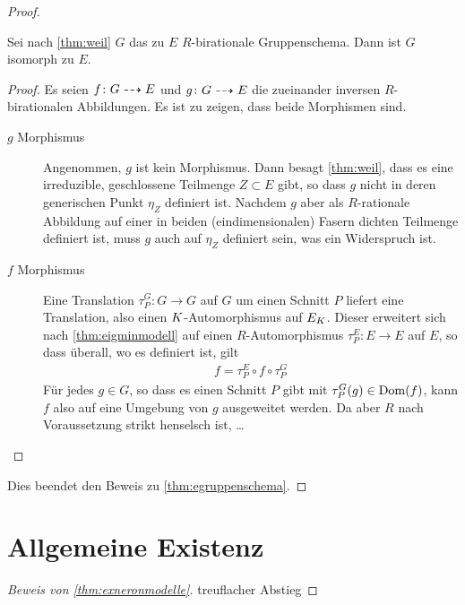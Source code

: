 \documentclass[german]{scrreprt}
\begin{document}
\begin{Satz}
\begin{proof}
    \begin{Lemma}
      Sei nach \ref{thm:weil} $G$ das zu $E$ $R$-birationale
      Gruppenschema. Dann ist $G$ isomorph zu $E$.
      \begin{proof}
        Es seien $f\colon G\dashrightarrow E$ und $g\colon G\dashrightarrow E$ die
        zueinander inversen $R$-birationalen Abbildungen.
        Es ist zu zeigen, dass beide Morphismen sind.
        \begin{description}
        \item[$g$ Morphismus] Angenommen, $g$ ist kein
          Morphismus. Dann besagt \ref{thm:weil}, dass es eine
          irreduzible, geschlossene Teilmenge $Z\subset E$ gibt, so
          dass $g$ nicht in deren generischen Punkt $\eta_Z$ definiert
          ist. Nachdem $g$ aber als $R$-rationale Abbildung auf einer
          in beiden (eindimensionalen) Fasern dichten Teilmenge
          definiert ist, muss $g$ auch auf $\eta_Z$ definiert sein,
          was ein Widerspruch ist.
        \item[$f$ Morphismus] Eine Translation $\tau_P^G\colon G\to G$
          auf $G$ um einen Schnitt $P$ liefert eine Translation, also
          einen $K$-Automorphismus auf $E_{K}$. Dieser erweitert sich
          nach \ref{thm:eigminmodell} auf einen $R$-Automorphismus
          $\tau_P^E\colon E\to E$ auf $E$, so dass überall, wo es
          definiert ist, gilt
          \begin{gather*}
            f = \tau_P^E\circ f\circ \tau_P^G
          \end{gather*}
          Für jedes $g\in G$, so dass es einen Schnitt $P$ gibt mit
          $\tau_P^G(g)\in\operatorname{Dom}(f)$, kann $f$ also auf eine Umgebung von
          $g$ ausgeweitet werden.
          Da aber $R$ nach Voraussetzung strikt henselsch ist, …
        \end{description}
      \end{proof}
    \end{Lemma}
    Dies beendet den Beweis zu \ref{thm:egruppenschema}.
  \end{proof}
\end{Satz}


\section{Allgemeine Existenz}
\begin{proof}[Beweis von \ref{thm:exneronmodelle}]
  treuflacher Abstieg
\end{proof}
\end{document}

